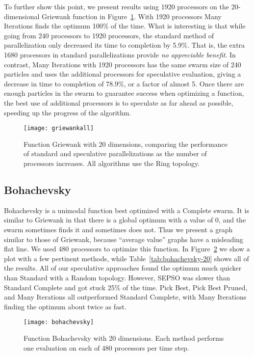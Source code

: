 \documentclass[ms,electronic,twosidetoc,letterpaper,chaptercenter,parttop,equalmargins]{byumsphd}
\newcommand{\fig}[1]{Figure~\ref{fig:#1}}
\newcommand{\tabref}[1]{Table~\ref{tab:#1}}
\begin{document}
To further show this point, we present results using 1920 processors on the
20-dimensional Griewank function in \fig{griewank-all}.  With 1920 processors
Many Iterations finds the optimum 100\% of the time.  What is interesting is
that while going from 240 processors to 1920 processors, the standard method of
parallelization only decreased its time to completion by 5.9\%.  That is, the
extra 1680 processors in standard parallelizations provide \emph{no appreciable
benefit}.  In contrast, Many Iterations with 1920 processors has the same swarm
size of 240 particles and uses the additional processors for speculative
evaluation, giving a decrease in time to completion of 78.9\%, or a factor of
almost 5.  Once there are enough particles in the swarm to guarantee success
when optimizing a function, the best use of additional processors is to
speculate as far ahead as possible, speeding up the progress of the algorithm.

\begin{figure}
  \centering
  \texttt{[image: griewankall]}
  \caption{Function Griewank with 20 dimensions, comparing the performance of
  standard and speculative parallelizations as the number of processors
  increases.  All algorithms use the Ring topology.}
  \label{fig:griewank-all}
\end{figure}

\subsection{Bohachevsky}

Bohachevsky is a unimodal function best optimized with a Complete swarm.  It is
similar to Griewank in that there is a global optimum with a value of 0, and
the swarm sometimes finds it and sometimes does not.  Thus we present a graph
similar to those of Griewank, because ``average value'' graphs have a
misleading flat line.  We used 480 processors to optimize this function.  In
\fig{bohachevsky} we show a plot with a few pertinent methods, while
\tabref{bohachevsky-20} shows all of the results.  All of our speculative
approaches found the optimum much quicker than Standard with a Random topology.
However, SEPSO was slower than Standard Complete and got stuck 25\% of the
time.  Pick Best, Pick Best Pruned, and Many Iterations all outperformed
Standard Complete, with Many Iterations finding the optimum about twice as
fast.

\begin{figure}
  \centering
  \texttt{[image: bohachevsky]}
  \caption{Function Bohachevsky with 20 dimensions.  Each method performs one
  evaluation on each of 480 processors per time step.}
  \label{fig:bohachevsky}
\end{figure}
\end{document}
